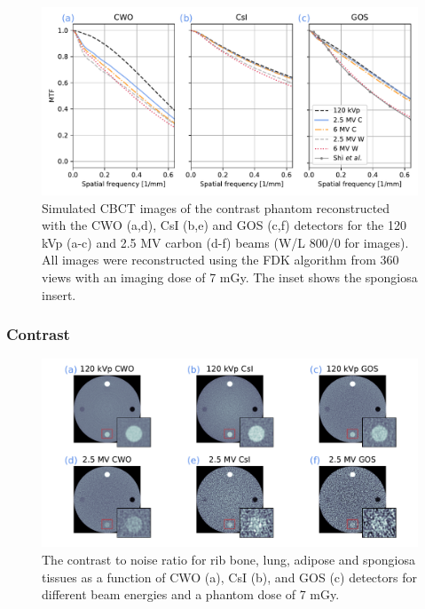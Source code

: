 \begin{figure}[ht!]
   \begin{center}
   \includegraphics[width=0.9\linewidth]{figures/Figure_2.pdf}
  \caption{Simulated CBCT images of the contrast phantom reconstructed with the CWO (a,d), CsI (b,e) and GOS (c,f) detectors for the 120 kVp (a-c) and 2.5 MV carbon (d-f) beams (W/L 800/0 for images). All images were reconstructed using the FDK algorithm from 360 views with an imaging dose of 7 mGy. The inset shows the spongiosa insert.
   \label{fig_phan} 
    }  %
    \end{center}
\end{figure}

\subsubsection{Contrast}

\begin{figure}[h!]   
    \begin{center}
    \centerline{\includegraphics[width=0.9\linewidth]{figures/Figure_3.pdf}}

  \caption{The contrast to noise ratio for rib bone, lung, adipose and spongiosa tissues as a function of CWO (a), CsI (b), and GOS (c) detectors for different beam energies and a phantom dose of 7 mGy. \label{fig_cnr}
    }  %
    \end{center}
\end{figure}

